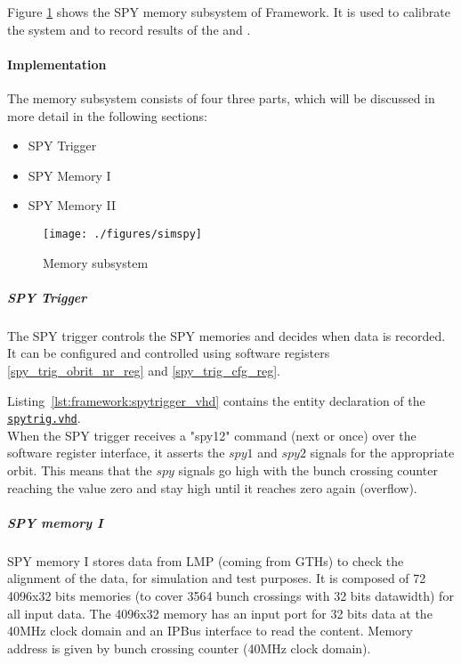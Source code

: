 Figure \ref{fig_simspy} shows the SPY memory subsystem of Framework.
It is used to calibrate the system and to record results of the \ugtl and \ufdl.

\paragraph{Implementation}\label{sec:framework:spy_impl}
The memory subsystem consists of four three parts, which will be discussed in more detail in the following sections:

\begin{itemize}
\item SPY Trigger
\item SPY Memory I
\item SPY Memory II
\end{itemize}

\begin{figure}[h]
\texttt{[image: ./figures/simspy]}
\caption{Memory subsystem}
\label{fig_simspy}
\end{figure}

\subparagraph{SPY Trigger}\label{sec:framework:spy_trigger}
The SPY trigger controls the SPY memories and decides when data is recorded. It can be configured and controlled using software registers \ref{spy_trig_obrit_nr_reg} and \ref{spy_trig_cfg_reg}.

Listing~\ref{lst:framework:spytrigger_vhd} contains the entity declaration of the \href{\gitbranch/firmware/hdl/payload/frame/spytrig.vhd}{\texttt{\textquotesingle spytrig.vhd\textquotesingle }}.\\



When the SPY trigger receives a "spy12" command (next or once) over the software register interface, it asserts the $spy1$ and $spy2$ signals for the appropriate orbit.
This means that the $spy$ signals go high with the bunch crossing counter reaching the value zero and stay high until it reaches zero again (overflow).

\subparagraph{SPY memory I}
SPY memory I stores data from LMP (coming from GTHs) to check the alignment of the data, for simulation and test purposes. It is composed of 72 4096x32 bits memories (to cover 3564 bunch crossings with 32 bits datawidth) for all input data. The 4096x32 memory has an input port for 32 bits data at the 40MHz clock domain and an IPBus interface to read the content. Memory address is given by bunch crossing counter (40MHz clock domain).

